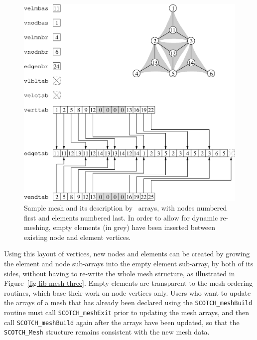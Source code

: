 \begin{figure}
\centering\includegraphics[scale=0.47]{s_f_me2.eps}
\caption{Sample mesh and its description by \libscotch\ arrays, with
nodes numbered first and elements numbered last. In order to allow for
dynamic re-meshing, empty elements (in grey) have been inserted between
existing node and element vertices.}
\label{fig-lib-mesh-two}
\end{figure}

Using this layout of vertices, new nodes and elements can be created
by growing the element and node sub-arrays into the empty element
sub-array, by both of its sides, without having to re-write the whole
mesh structure, as illustrated in
Figure~\ref{fig-lib-mesh-three}. Empty elements are transparent to the
mesh ordering routines, which base their work on node vertices only.
Users who want to update the arrays of a mesh that has already
been declared using the {\tt SCOTCH\_\lbt mesh\lbo Build} routine must
call {\tt SCOTCH\_\lbt mesh\lbo Exit} prior to updating the mesh arrays,
and then call {\tt SCOTCH\_\lbt mesh\lbo Build} again after the arrays
have been updated, so that the {\tt SCOTCH\_\lbt Mesh} structure remains
consistent with the new mesh data.


